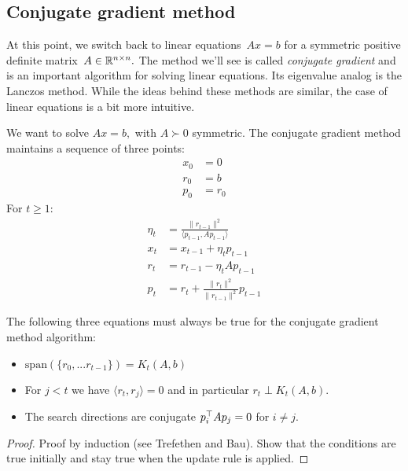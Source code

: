 \subsection{Conjugate gradient method}
At this point, we switch back to linear equations~$Ax=b$ for a symmetric
positive definite matrix~$A\in\mathbb{R}^{n\times n}.$ The method we'll see is called
\emph{conjugate gradient} and is an important algorithm for solving linear
equations. Its eigenvalue analog is the Lanczos method. While the ideas behind
these methods are similar, the case of linear equations is a bit more intuitive.
%
\begin{definition}
We want to solve $Ax = b,$ with  $A\succ 0$ symmetric. The conjugate gradient
method maintains a sequence of three points:
\begin{align*}
x_0 &= 0 \tag{ ``candidate solution''} \\
r_0 &= b \tag{ ``residual''} \\
p_0 &= r_0 \tag{ ``search direction''}
\end{align*}
For $t \ge 1:$
\begin{align*}
\eta_t &= \frac{\|r_{t-1}\|^2}{\langle p_{t-1}, Ap_{t-1}\rangle} \tag{``step size''} \\
x_t &= x_{t-1} + \eta_t p_{t-1} \\
r_t &= r_{t-1} - \eta_t A p_{t-1} \\
p_t &= r_t + \frac{\|r_t\|^2}{\|r_{t-1}\|^2}p_{t-1}
\end{align*}
\end{definition}

\begin{lemma}
The following three equations must always be true for the conjugate gradient
method algorithm:
\begin{itemize}
\item $\mathrm{span}(\{r_0, ...r_{t-1}\}) = K_t(A,b)$
\item For $j<t$ we have $\langle r_t, r_j\rangle = 0$ and in particular
$r_t \perp K_t(A,b).$
\item The search directions are conjugate $p_i^{\top} A p_j = 0$ for $i\ne j.$
\end{itemize}
\end{lemma}
\begin{proof}
Proof by induction (see Trefethen and Bau). Show that the conditions are true
initially and stay true when the update rule is applied.  
\end{proof}

